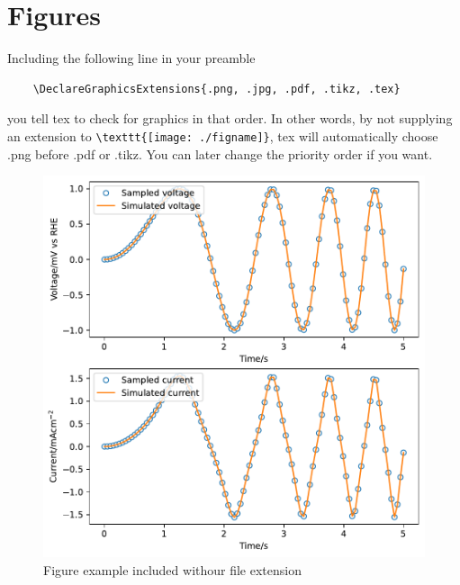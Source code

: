 


    \section{Figures}
    Including the following line in your preamble

    \begin{lstlisting}
    \DeclareGraphicsExtensions{.png, .jpg, .pdf, .tikz, .tex}
    \end{lstlisting}

    you tell tex to check for graphics in that order. In other words, 
    by not supplying an extension to  \lstinline|\texttt{[image: ./figname]}|, tex will automatically choose .png before .pdf or .tikz.
    You can later change the priority order if you want. 



    \begin{figure}[htbp]
        \includegraphics[width=\textwidth]{./figs/example_1}
        \caption{Figure example included withour file extension}
        \label{figures:fig:example:1}
    \end{figure}


